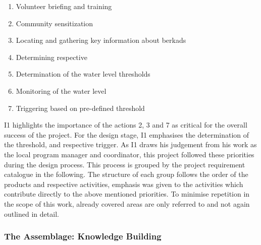 \begin{enumerate}
    \item Volunteer briefing and training
    \item Community sensitization
    \item Locating and gathering key information about berkads
    \item Determining respective 
    \item Determination of the water level thresholds 
    \item Monitoring of the water level
    \item Triggering  based on pre-defined threshold 
\end{enumerate}

I1 highlights the importance of the actions 2, 3 and 7 as critical for the overall success of the project. For the design stage, I1 emphasises the determination of the threshold,  and respective trigger. As I1 draws his judgement from his work as the local program manager and coordinator, this project followed these priorities during the design process. This process is grouped by the project requirement catalogue in the following. The structure of each group follows the order of the products and respective activities, emphasis was given to the activities which contribute directly to the above mentioned priorities. To minimise repetition in the scope of this work, already covered areas are only referred to and not again outlined in detail. 

\subsubsection*{The Assemblage: Knowledge Building}\label{subsubsec:assemblage}

